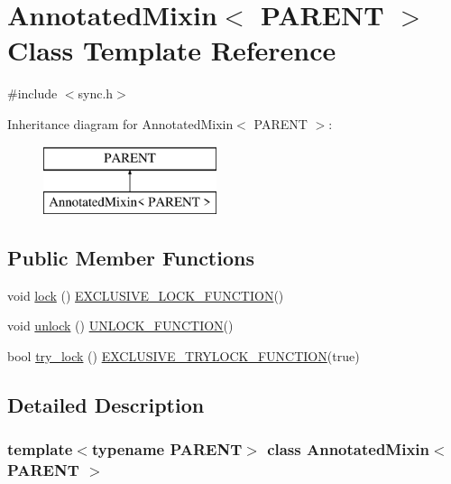 \hypertarget{class_annotated_mixin}{}\section{Annotated\+Mixin$<$ P\+A\+R\+E\+NT $>$ Class Template Reference}
\label{class_annotated_mixin}


{\ttfamily \#include $<$sync.\+h$>$}

Inheritance diagram for Annotated\+Mixin$<$ P\+A\+R\+E\+NT $>$\+:\begin{figure}[H]
\begin{center}
\leavevmode
\includegraphics[height=2.000000cm]{class_annotated_mixin}
\end{center}
\end{figure}
\subsection*{Public Member Functions}
\begin{DoxyCompactItemize}
\item 
void \mbox{\hyperlink{class_annotated_mixin_ad1f35c6d1b8a8e980fff45e7e7cb46d3}{lock}} () \mbox{\hyperlink{threadsafety_8h_a77729163b7f6867da40ad5daa5f926f3}{E\+X\+C\+L\+U\+S\+I\+V\+E\+\_\+\+L\+O\+C\+K\+\_\+\+F\+U\+N\+C\+T\+I\+ON}}()
\item 
void \mbox{\hyperlink{class_annotated_mixin_acc2e3da37c2d9dd483b859572e32bc24}{unlock}} () \mbox{\hyperlink{threadsafety_8h_abd56e19f9b4781b1a5212a46951cf5c3}{U\+N\+L\+O\+C\+K\+\_\+\+F\+U\+N\+C\+T\+I\+ON}}()
\item 
bool \mbox{\hyperlink{class_annotated_mixin_a9a33deab2da56790d8b5d30b1fd8350d}{try\+\_\+lock}} () \mbox{\hyperlink{threadsafety_8h_a3c67d370ed1f55064d85e01076aad534}{E\+X\+C\+L\+U\+S\+I\+V\+E\+\_\+\+T\+R\+Y\+L\+O\+C\+K\+\_\+\+F\+U\+N\+C\+T\+I\+ON}}(true)
\end{DoxyCompactItemize}


\subsection{Detailed Description}
\subsubsection*{template$<$typename P\+A\+R\+E\+NT$>$\newline
class Annotated\+Mixin$<$ P\+A\+R\+E\+N\+T $>$}

